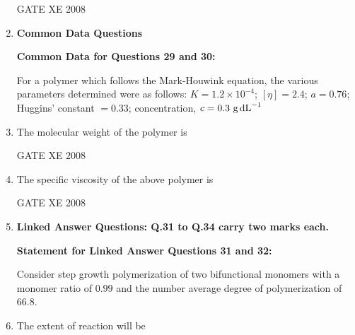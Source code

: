 \documentclass[12pt]{article}
\begin{document}
\begin{enumerate}
GATE XE 2008

\item[] \textbf{\Large Common Data Questions}

\textbf{Common Data for Questions 29 and 30:}

 For a polymer which follows the Mark-Houwink equation, the various parameters determined were as follows:  
$K = 1.2 \times 10^{-4}$; $[\eta] = 2.4$; $a = 0.76$; Huggins' constant $= 0.33$; concentration, $c = 0.3\ \text{g\,dL}^{-1}$

\item The molecular weight of the polymer is  

\begin{enumerate}
\end{enumerate}

GATE XE 2008

\item The specific viscosity of the above polymer is 

\begin{enumerate}
\end{enumerate}

GATE XE 2008



\item[] \textbf{\Large Linked Answer Questions: Q.31 to Q.34 carry two marks each.}

\textbf{Statement for Linked Answer Questions 31 and 32:}  

 Consider step growth polymerization of two bifunctional monomers with a monomer ratio of $0.99$ and the number average degree of polymerization of $66.8$.

\item The extent of reaction will be  

\begin{enumerate}
\end{enumerate}


\end{enumerate}
\end{document}
